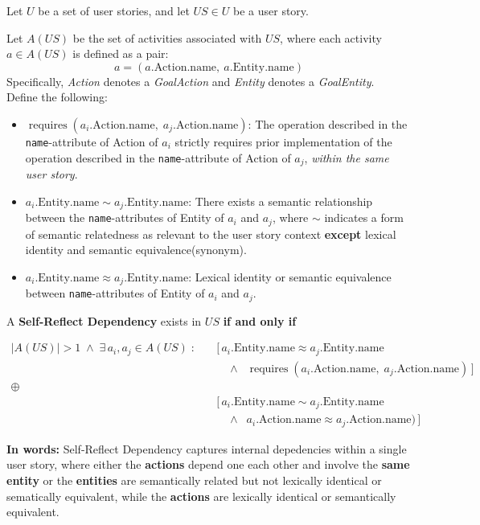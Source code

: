 \documentclass[a4paper, 11 pt, leqno, titlepage = true, toc=bib, oneside]{scrbook}
\begin{document}
\begin{defin}
    Let $U$ be a set of user stories, and let $US \in U$ be a user story.

    Let $A(US)$ be the set of activities associated with $US$, where each activity $a \in A(US)$ is defined as a pair:
    \[
        a = (a.\text{Action.name},\ a.\text{Entity.name})
    \]
    Specifically, \textit{Action} denotes a \emph{GoalAction} and \textit{Entity} denotes a \emph{GoalEntity}.\\
    Define the following:
    \begin{itemize}
        \item $\operatorname{requires}(a_i.\text{Action.name},\; a_j.\text{Action.name})$: The operation described in the \texttt{name}-attribute of Action of $a_i$ strictly requires prior implementation of the operation described in the \texttt{name}-attribute of Action of $a_j$, \emph{within the same user story}.
        \item $a_i.\text{Entity.name} \sim a_j.\text{Entity.name}$: There exists a semantic relationship between the \texttt{name}-attributes of Entity of $a_i$ and $a_j$, where $\sim$ indicates a form of semantic relatedness as relevant to the user story context \textbf{except} lexical identity and semantic equivalence(synonym). 
        \item $a_i.\text{Entity.name} \approx a_j.\text{Entity.name}$: Lexical identity or semantic equivalence between \texttt{name}-attributes of Entity of $a_i$ and $a_j$.
    \end{itemize}

    A \textbf{Self-Reflect Dependency} exists in $US$ \textbf{if and only if}

    \begin{align*}
        |A(US)| > 1\;\land\;
        \exists\, a_i, a_j \in A(US)\;:\quad
         & \big[\, a_i.\text{Entity.name} \approx a_j.\text{Entity.name} \\
         & \quad \land\;\;
            \operatorname{requires}(a_i.\text{Action.name},\; a_j.\text{Action.name})\, \big] \\
        \oplus 
        \\
            & \big[\, a_i.\text{Entity.name} \sim a_j.\text{Entity.name} \\
            & \quad \land\;\;
                a_i.\text{Action.name} \approx a_j.\text{Action.name})\, \big]
    \end{align*}


    \textbf{In words: }Self-Reflect Dependency captures internal depedencies within a single user story, where either the \textbf{actions} depend one each other and involve the \textbf{same entity} or the \textbf{entities} are semantically related but not lexically identical or sematically equivalent, while the \textbf{actions} are lexically identical or semantically equivalent. 
\end{defin}
\end{document}
